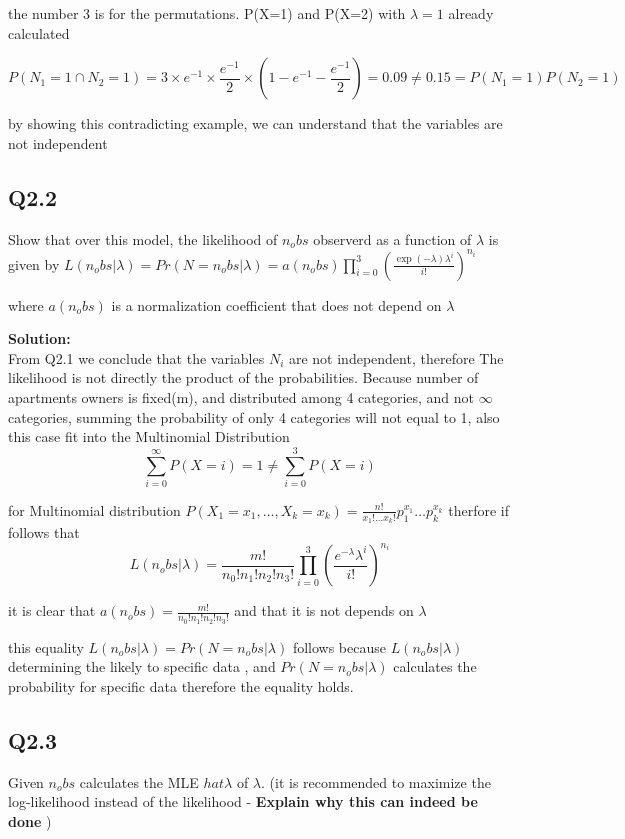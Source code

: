 the number 3 is for the permutations. P(X=1) and P(X=2) with $\lambda = 1$ already calculated

\[
    P(N_1 = 1 \cap N_2 = 1) = 3 \times e^{-1} \times \frac{ e^{-1}}{2} \times (1- e^{-1} - \frac{ e^{-1}}{2}) = 0.09 \neq 0.15 =  P(N_1=1)P(N_2=1)
\]

by showing this contradicting example, we can understand that the variables are not independent




\subsection{Q2.2}
Show that over this model, the likelihood of $n_obs$ observerd as a function of $\lambda$
is given by
$ L(n_obs|\lambda)=Pr(N=n_obs|\lambda)=a(n_obs)\prod_{i=0}^{3}\left(\frac{\exp(-\lambda)\lambda^i}{i!} \right)^{n_i} $

where $a(n_obs)$ is a normalization coefficient that does not depend on $\lambda$

\indent \textbf{Solution:} \\

From Q2.1 we conclude that the variables $N_i$ are not independent, therefore The
likelihood is not directly the product of the probabilities.
Because number of apartments owners is fixed(m), and distributed among 4 categories, 
and not $\infty$ categories, summing the probability of only 4 categories will not equal to 1, 
also this case fit into the Multinomial Distribution
\[
    \sum_{i=0}^{\infty}P(X=i) = 1 \neq \sum_{i=0}^{3}P(X=i)
\]

for Multinomial distribution $P(X_1=x_1,\dots,X_k=x_k)=\frac{n!}{x_1!\dots x_k!} p_1^{x_1}\dots p_k^{x_k}$
therfore if follows that 
\[
L(n_obs|\lambda) = \frac{m!}{n_0!n_1!n_2!n_3!} \prod_{i=0}^{3} \left( \frac{e^{-\lambda}\lambda^i}{i!} \right)^{n_i} 
\]

it is clear that $a(n_obs)=\frac{m!}{n_0!n_1!n_2!n_3!}$ and that it is not depends on $\lambda$ 

this equality $ L(n_obs|\lambda)=Pr(N=n_obs|\lambda) $ follows because $L(n_obs|\lambda)$ determining the likely 
to specific data , and $Pr(N=n_obs|\lambda)$ calculates the probability for specific data therefore the equality holds.

\subsection{Q2.3}
Given $n_obs$ calculates the MLE $hat{\lambda}$ of $\lambda$. (it is recommended to maximize the 
log-likelihood instead of the likelihood - \textbf{Explain why this can indeed be done} )

